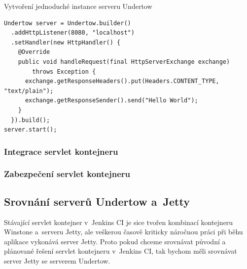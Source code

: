 
\begin{priklad} Vytvoření jednoduché instance serveru Undertow
\begin{verbatim}
Undertow server = Undertow.builder()
  .addHttpListener(8080, "localhost")
  .setHandler(new HttpHandler() {
    @Override
    public void handleRequest(final HttpServerExchange exchange) 
        throws Exception {
      exchange.getResponseHeaders().put(Headers.CONTENT_TYPE, "text/plain");
      exchange.getResponseSender().send("Hello World");
    }
  }).build();
server.start();
\end{verbatim}
\end{priklad}

            \subsubsection{Integrace servlet kontejneru}



            \subsubsection{Zabezpečení servlet kontejneru}
                
 
        
        \subsection{Srovnání serverů Undertow a~Jetty}\label{srovnani}
            Stávající servlet kontejner v~Jenkins CI je sice tvořen
            kombinací kontejneru Winstone a~serveru Jetty, ale veškerou
            časově kriticky náročnou práci při běhu aplikace vykonává server
            Jetty. Proto pokud chceme srovnávat původní a plánované řešení servlet kontejneru
            v~Jenkins CI, tak bychom měli srovnávat server Jetty se serverem Undertow.

